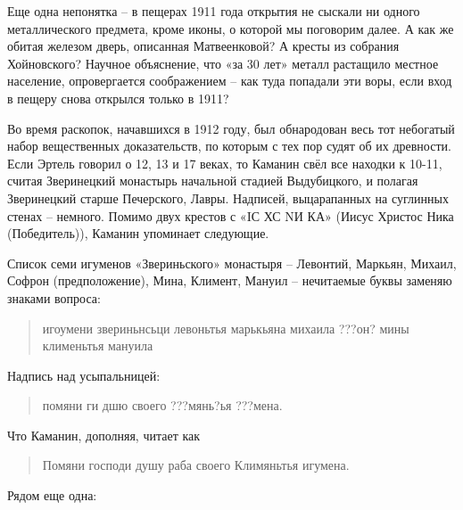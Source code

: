 Еще одна непонятка – в пещерах 1911 года открытия не сыскали ни одного металлического предмета, кроме иконы, о которой мы поговорим далее. А как же обитая железом дверь, описанная Матвеенковой? А кресты из собрания Хойновского? Научное объяснение, что «за 30 лет» металл растащило местное население, опровергается соображением – как туда попадали эти воры, если вход в пещеру снова открылся только в 1911?



Во время раскопок, начавшихся в 1912 году, был обнародован весь тот небогатый набор вещественных доказательств, по которым с тех пор судят об их древности. Если Эртель говорил о 12, 13 и 17 веках, то Каманин свёл все находки к 10-11, считая Зверинецкий монастырь начальной стадией Выдубицкого, и полагая Зверинецкий старше Печерского, Лавры. Надписей, выцарапанных на суглинных стенах – немного. Помимо двух крестов с «IС ХС NИ КА» (Иисус Христос Ника (Победитель)), Каманин упоминает следующие.

Список семи игуменов «Звериньского» монастыря – Левонтий, Маркьян, Михаил, Софрон (предположение), Мина, Климент, Мануил – нечитаемые буквы заменяю знаками вопроса: 

\begin{quotation}
игоумени звериньнсьци левоньтья марькьяна михаила ???он? мины клименьтья мануила\end{quotation}

Надпись над усыпальницей: 

\begin{quotation}
помяни ги дшю своего ???мянь?ья ???мена.\end{quotation}

Что Каманин, дополняя, читает как 

\begin{quotation}
Помяни господи душу раба своего Климяньтья игумена.
\end{quotation}

Рядом еще одна: 

